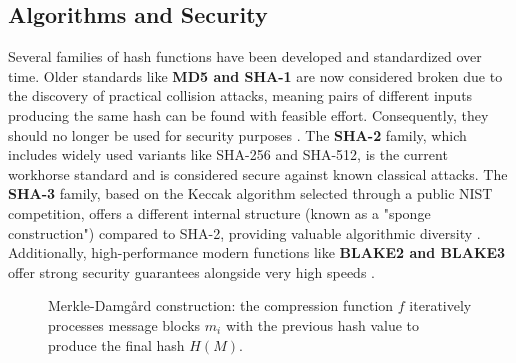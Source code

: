 \subsection{Algorithms and Security}
Several families of hash functions have been developed and standardized over time. Older standards like \textbf{MD5 and SHA-1} are now considered broken due to the discovery of practical collision attacks, meaning pairs of different inputs producing the same hash can be found with feasible effort. Consequently, they should no longer be used for security purposes \parencite{stallings2017cryptography}. The \textbf{SHA-2} family, which includes widely used variants like SHA-256 and SHA-512, is the current workhorse standard and is considered secure against known classical attacks. The \textbf{SHA-3} family, based on the Keccak algorithm selected through a public NIST competition, offers a different internal structure (known as a "sponge construction") compared to SHA-2, providing valuable algorithmic diversity \parencite{nist_fips202}. Additionally, high-performance modern functions like \textbf{BLAKE2 and BLAKE3} offer strong security guarantees alongside very high speeds \parencite{blake3}.

\begin{figure}[ht]
    \centering
    \caption{Merkle-Damgård construction: the compression function $f$ iteratively processes message blocks $m_i$ with the previous hash value to produce the final hash $H(M)$.}
    \label{fig:merkle_damgard}
\end{figure}

